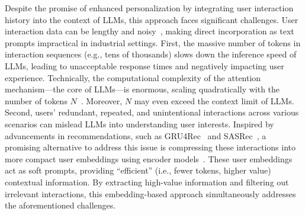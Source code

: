
Despite the promise of enhanced personalization by integrating user interaction history into the context of LLMs, this approach faces significant challenges. User interaction data can be lengthy and noisy~\cite{wang2021denoising,tian2022learning,qin2021world}, making direct incorporation as text prompts impractical in industrial settings.
First, the massive number of tokens in interaction sequences (e.g., tens of thousands) slows down the inference speed of LLMs, leading to unacceptable response times and negatively impacting user experience. Technically, the computational complexity of the attention mechanism---the core of LLMs---is enormous, scaling quadratically with the number of tokens $N$~\cite{vaswani2017attention}. Moreover, $N$ may even exceed the context limit of LLMs.
Second, users' redundant, repeated, and unintentional interactions across various scenarios can mislead LLMs into understanding user interests.
Inspired by advancements in recommendations, such as GRU4Rec~\cite{hidasi2015session} and SASRec~\cite{kang2018self}, a promising alternative to address this issue is compressing these interactions into more compact user embeddings using encoder models~\cite{li2023prompt,ning2024user,li2023personalized}. These user embeddings act as soft prompts, providing ``efficient'' (i.e., fewer tokens, higher value) contextual information. By extracting high-value information and filtering out irrelevant interactions, this embedding-based approach simultaneously addresses the aforementioned challenges.


